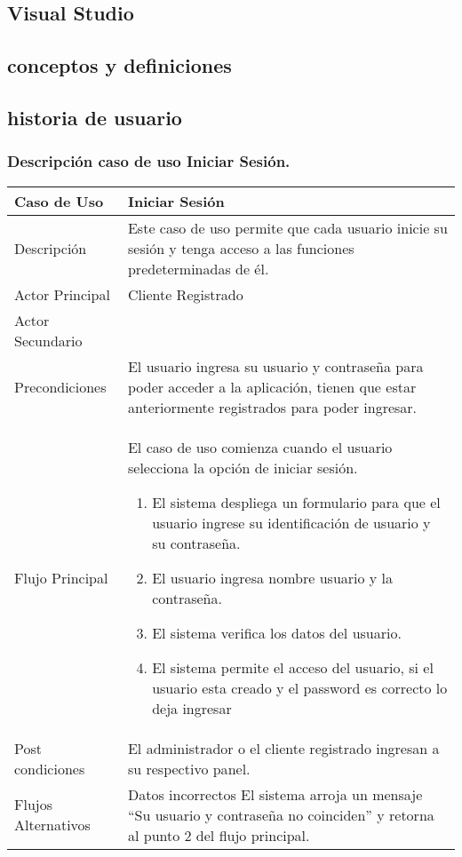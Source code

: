 \documentclass[12pt,a4paper]{article}
\newcommand{\newsubsection}[1]{\subsection{\hspace{4mm} #1}}
\begin{document}
\subsection*{Visual Studio}%
\newsubsection{conceptos y definiciones}

\newpage
\subsection*{historia de usuario}
%
%
\subsubsection*{Descripción caso de uso Iniciar Sesión.}
    \begin{table}[h]
        \centering
        \begin{tabular}{| p{3cm}| p{11cm} |} 
        \hline  
        Caso de Uso         &    \textbf{Iniciar Sesión}   \\ 
        \hline
        Descripción         &    Este caso de uso permite que cada usuario inicie su sesión y tenga acceso a las funciones predeterminadas de él.   \\ 
        \hline
        Actor Principal     &    Cliente Registrado   \\ 
        \hline
        Actor Secundario    &       \\ 
        \hline
        Precondiciones      &    El usuario ingresa su usuario y contraseña para poder acceder a la aplicación, tienen que estar anteriormente registrados para poder ingresar.   \\ 
        \hline
        Flujo Principal     &    El caso de uso comienza cuando el usuario selecciona la opción de iniciar sesión.

            \begin{enumerate}
                \item{} El sistema despliega un formulario para que el usuario ingrese su identificación de usuario y su contraseña.
                \item{} El usuario ingresa nombre usuario y la contraseña.
                \item{} El sistema verifica los datos del usuario.
                \item{} El sistema permite el acceso del usuario, si el usuario esta creado y el password es correcto lo deja ingresar
            \end{enumerate}
        \\  
        \hline
        Post condiciones    &    El administrador o el cliente registrado ingresan a su respectivo panel.   \\  
        \hline
        Flujos Alternativos &    Datos incorrectos
        El sistema arroja un mensaje “Su usuario y contraseña no coinciden” y retorna al punto 2 del flujo principal.   \\  
        \hline
        \end{tabular}
    \end{table}
\end{document}
